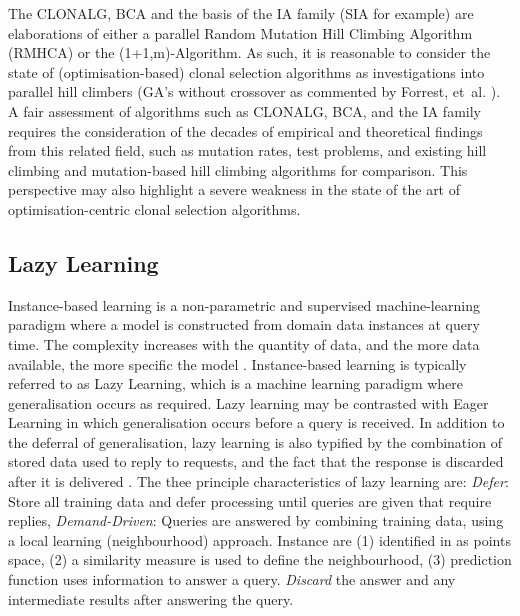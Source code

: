 The CLONALG, BCA and the basis of the IA family (SIA for example) are elaborations of either a parallel Random Mutation Hill Climbing Algorithm (RMHCA) or the (1+1,m)-Algorithm. As such, it is reasonable to consider the state of (optimisation-based) clonal selection algorithms as investigations into parallel hill climbers (GA's without crossover as commented by Forrest, et~al. \cite{Forrest1993a}). A fair assessment of algorithms such as CLONALG, BCA, and the IA family requires the consideration of the decades of empirical and theoretical findings from this related field, such as mutation rates, test problems, and existing hill climbing and mutation-based hill climbing algorithms for comparison. This perspective may also highlight a severe weakness in the state of the art of optimisation-centric clonal selection algorithms.

%
%
\subsection{Lazy Learning}
\label{subsec:cs:related:lazy}
Instance-based learning is a non-parametric and supervised machine-learning paradigm where a model is constructed from domain data instances at query time. The complexity increases with the quantity of data, and the more data available, the more specific the model \cite{Aha1991a, Russell1995}. Instance-based learning is typically referred to as Lazy Learning, which is a machine learning paradigm where generalisation occurs as required. Lazy learning may be contrasted with Eager Learning in which generalisation occurs before a query is received. In addition to the deferral of generalisation, lazy learning is also typified by the combination of stored data used to reply to requests, and the fact that the response is discarded after it is delivered \cite{Aha1997, Aha1998, Wettschereck1997}. The thee principle characteristics of lazy learning are: \emph{Defer}: Store all training data and defer processing until queries are given that require replies, \emph{Demand-Driven}: Queries are answered by combining training data, using a local learning (neighbourhood) approach. Instance are (1) identified in as points space, (2) a similarity measure is used to define the neighbourhood, (3) prediction function uses information to answer a query. \emph{Discard} the answer and any intermediate results after answering the query.

